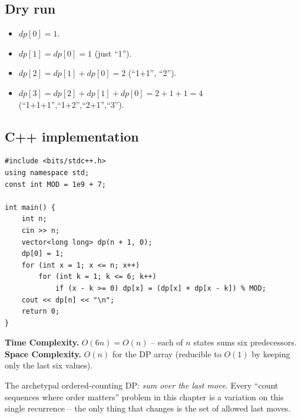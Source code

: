 \subsection*{Dry run}


\begin{itemize}
  \item $\textit{dp}[0]=1$.
  \item $\textit{dp}[1]=\textit{dp}[0]=1$ (just ``1'').
  \item $\textit{dp}[2]=\textit{dp}[1]+\textit{dp}[0]=2$ (``1+1'',
        ``2'').
  \item $\textit{dp}[3]=\textit{dp}[2]+\textit{dp}[1]+\textit{dp}[0]
        =2+1+1=4$ (``1+1+1'',``1+2'',``2+1'',``3'').
\end{itemize}

\subsection*{C++ implementation}

\begin{lstlisting}
#include <bits/stdc++.h>
using namespace std;
const int MOD = 1e9 + 7;

int main() {
    int n;
    cin >> n;
    vector<long long> dp(n + 1, 0);
    dp[0] = 1;
    for (int x = 1; x <= n; x++)
        for (int k = 1; k <= 6; k++)
            if (x - k >= 0) dp[x] = (dp[x] + dp[x - k]) % MOD;
    cout << dp[n] << "\n";
    return 0;
}
\end{lstlisting}

\begin{complexitybox}
\textbf{Time Complexity.} $O(6n)=O(n)$ -- each of $n$ states sums six
predecessors. \textbf{Space Complexity.} $O(n)$ for the DP array (reducible
to $O(1)$ by keeping only the last six values).
\end{complexitybox}

\begin{takeawaybox}
The archetypal ordered-counting DP: \emph{sum over the last move}. Every
``count sequences where order matters'' problem in this chapter is a
variation on this single recurrence -- the only thing that changes is the
set of allowed last moves.
\end{takeawaybox}
